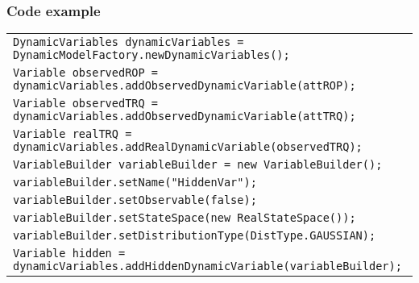 \subsubsection*{Code example}

\begin{table}[H]
\begin{tabular}{l} \hline

        \texttt{DynamicVariables dynamicVariables = DynamicModelFactory.newDynamicVariables();}\\

        \texttt{Variable observedROP = dynamicVariables.addObservedDynamicVariable(attROP);}\\
        \texttt{Variable observedTRQ = dynamicVariables.addObservedDynamicVariable(attTRQ);}\\
        \texttt{Variable realTRQ = dynamicVariables.addRealDynamicVariable(observedTRQ);}\\

        \texttt{VariableBuilder variableBuilder = new VariableBuilder();}\\
        \texttt{variableBuilder.setName("HiddenVar");}\\
        \texttt{variableBuilder.setObservable(false);}\\
        \texttt{variableBuilder.setStateSpace(new RealStateSpace()); }\\
        \texttt{variableBuilder.setDistributionType(DistType.GAUSSIAN);}\\
        \texttt{Variable hidden = dynamicVariables.addHiddenDynamicVariable(variableBuilder);}\\ \hline 

\end{tabular}
\end{table}

        
        
        
        
        
        